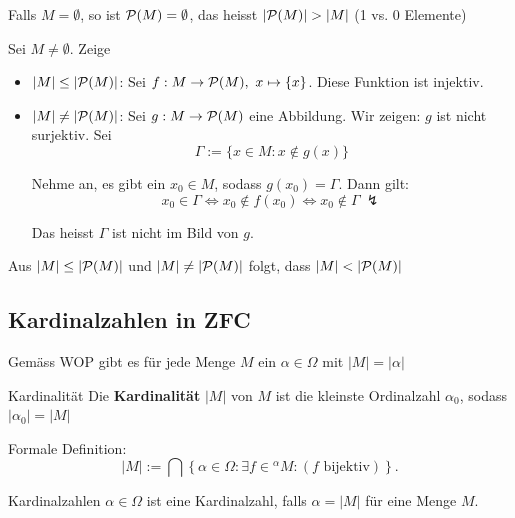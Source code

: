 \documentclass[12pt]{article}
\begin{document}
\begin{proofbox}
    Falls $M = \emptyset$, so ist $\mathcal{P}(M) = {\emptyset}$, das heisst $\lvert \mathcal{P}(M) \rvert > \lvert M \rvert$ (1 vs. 0 Elemente)

    Sei $M \neq \emptyset$. Zeige
    \begin{itemize}
        \item \underline{$\lvert M \rvert \leq \lvert \mathcal{P}(M) \rvert$}: Sei $f: M \rightarrow \mathcal{P}(M),\ x \mapsto \{x\}$. Diese Funktion ist injektiv.
        \item \underline{$\lvert M \rvert \neq \lvert \mathcal{P}(M) \rvert$}: Sei $g: M \rightarrow \mathcal{P}(M)$ eine Abbildung. Wir zeigen: $g$ ist nicht surjektiv. Sei 
        $$
            \Gamma := \{x \in M : x \notin g(x)\}
        $$

        Nehme an, es gibt ein $x_0 \in M$, sodass $g(x_0) = \Gamma$. Dann gilt: 
        $$
            x_0 \in \Gamma \iff x_0 \notin f(x_0) \iff x_0 \notin \Gamma \ \lightning
        $$

        Das heisst $\Gamma$ ist nicht im Bild von $g$.
    \end{itemize}

    Aus $\lvert M \rvert \leq \lvert \mathcal{P}(M) \rvert$ und $\lvert M \rvert \neq \lvert \mathcal{P}(M) \rvert$ folgt, dass $\lvert M \rvert < \lvert \mathcal{P}(M) \rvert$
\end{proofbox}

\subsection{Kardinalzahlen in ZFC}

Gemäss WOP gibt es für jede Menge $M$ ein $\alpha \in \Omega$ mit $\lvert M \rvert  = \lvert \alpha \rvert$

\begin{definition}{Kardinalität}{}
    Die \textbf{Kardinalität} $\lvert M \rvert$ von $M$ ist die kleinste Ordinalzahl $\alpha_0$, sodass $\lvert \alpha_0 \rvert = \lvert M \rvert $

    Formale Definition:
    $$
        |M| := \bigcap \left\{ \alpha \in \Omega : \exists f \in {}^\alpha M : (f \text{ bijektiv}) \right\}.
    $$
\end{definition}

\begin{definition}{Kardinalzahlen}{}
    $\alpha \in \Omega$ ist eine Kardinalzahl, falls $\alpha = |M|$ für eine Menge $M$.
\end{definition}
\end{document}
